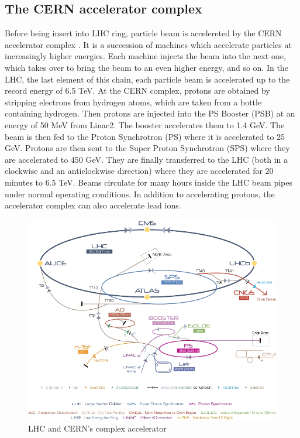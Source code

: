 \documentclass[a4paper, oneside, 11pt, openright]{book}
\begin{document}
				\subsection{The CERN accelerator complex}
					Before being insert into LHC ring, particle beam is accelereted by the CERN accelerator complex \cite{Acc. complex}. It is a succession of machines which accelerate particles at increasingly higher energies. Each machine injects the beam into the next one, which takes over to bring the beam to an even higher energy, and so on. In  the  LHC, the  last  element  of  this  chain, each particle beam is accelerated up to the record energy of 6.5 TeV. At the CERN complex, protons are obtained by stripping electrons from hydrogen atoms, which are taken from a bottle containing hydrogen. Then protons are injected into the PS Booster (PSB) at an  energy of 50 MeV from Linac2. The  booster  accelerates  them  to  1.4  GeV.  The  beam  is  then  fed  to  the  Proton  Synchrotron  (PS)  where  it  is  accelerated  to  25 GeV. Protons are then sent to the Super Proton Synchrotron (SPS) where they are accelerated to 450 GeV. They  are  finally  transferred  to  the  LHC  (both  in  a  clockwise  and an anticlockwise direction) where they are accelerated for 20 minutes to 6.5 TeV. Beams circulate for many hours inside the LHC beam pipes under normal operating conditions.
					In addition to accelerating protons, the accelerator complex can also accelerate lead ions. 
					\begin{figure}
						\centering
						\includegraphics[width=0.45\textheight]{tesi_images/CERN.png}
						\caption{LHC and CERN's complex accelerator}
						\label{fig:CERN structure}
					\end{figure}
\end{document}
